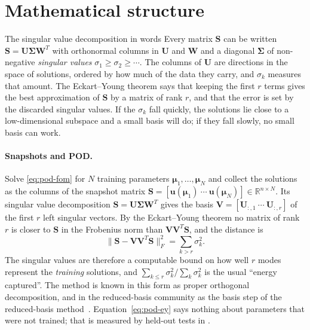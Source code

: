 \section{Mathematical structure}\label{sec:pod-math}

\begin{sidenote}{The singular value decomposition in words}
Every matrix $\bm S$ can be written $\bm S=\bm U\bm\Sigma\bm W^T$ with orthonormal columns in $\bm U$ and $\bm W$ and a diagonal $\bm\Sigma$ of non-negative \emph{singular values} $\sigma_1\ge\sigma_2\ge\cdots$. The columns of $\bm U$ are directions in the space of solutions, ordered by how much of the data they carry, and $\sigma_k$ measures that amount. The Eckart--Young theorem says that keeping the first $r$ terms gives the best approximation of $\bm S$ by a matrix of rank $r$, and that the error is set by the discarded singular values. If the $\sigma_k$ fall quickly, the solutions lie close to a low-dimensional subspace and a small basis will do; if they fall slowly, no small basis can work.
\end{sidenote}

\paragraph{Snapshots and POD.}
Solve \eqref{eq:pod-fom} for $N$ training parameters $\bm\mu_1,\dots,\bm\mu_N$ and collect the solutions as the columns of the snapshot matrix $\bm S=[\bm u(\bm\mu_1)\ \cdots\ \bm u(\bm\mu_N)]\in\mathbb R^{n\times N}$. Its singular value decomposition $\bm S=\bm U\bm\Sigma\bm W^T$ gives the basis $\bm V=[\bm U_{:,1}\ \cdots\ \bm U_{:,r}]$ of the first $r$ left singular vectors. By the Eckart--Young theorem no matrix of rank $r$ is closer to $\bm S$ in the Frobenius norm than $\bm V\bm V^T\bm S$, and the distance is
\begin{equation}\label{eq:pod-ey}
\|\bm S-\bm V\bm V^T\bm S\|_F^2=\sum_{k>r}\sigma_k^2 .
\end{equation}
The singular values are therefore a computable bound on how well $r$ modes represent the \emph{training} solutions, and $\sum_{k\le r}\sigma_k^2/\sum_k\sigma_k^2$ is the usual ``energy captured''. The method is known in this form as proper orthogonal decomposition, and in the reduced-basis community as the basis step of the reduced-basis method~\cite{berkooz1993pod,hesthaven2016rb}. Equation~\eqref{eq:pod-ey} says nothing about parameters that were not trained; that is measured by held-out tests in .

